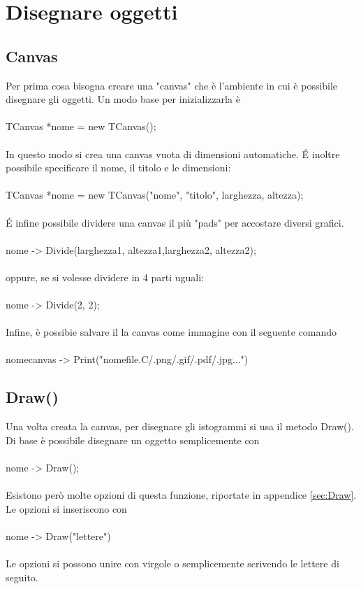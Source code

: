 \documentclass[10pt,a4paper]{article}
\begin{document}
\section{Disegnare oggetti}
\subsection{Canvas}
Per prima cosa bisogna creare una "canvas" che è l'ambiente in cui è possibile disegnare gli oggetti. Un modo base per inizializzarla è\\\\
TCanvas *nome = new TCanvas();\\\\
In questo modo si crea una canvas vuota di dimensioni automatiche. \'{E} inoltre possibile specificare il nome, il titolo e le dimensioni:\\\\
TCanvas *nome = new TCanvas("nome", "titolo", larghezza, altezza);\\\\
\'{E} infine possibile dividere una canvas il più "pads" per accostare diversi grafici.\\\\
nome -> Divide(larghezza1, altezza1,larghezza2, altezza2);\\\\
oppure, se si volesse dividere in 4 parti uguali:\\\\
nome -> Divide(2, 2);\\\\
Infine, è possibie salvare il la canvas come immagine con il seguente comando\\\\
nomecanvas -> Print("nomefile.C/.png/.gif/.pdf/.jpg...")
\subsection{Draw()}
Una volta creata la canvas, per disegnare gli istogrammi si usa il metodo Draw(). Di base è possibile disegnare un oggetto semplicemente con\\\\
nome -> Draw();\\\\ 
Esistono però molte opzioni di questa funzione, riportate in appendice \ref{sec:Draw}. Le opzioni si inseriscono con\\\\
nome -> Draw("lettere")\\\\
Le opzioni si possono unire con virgole o semplicemente scrivendo le lettere di seguito.
\end{document}
